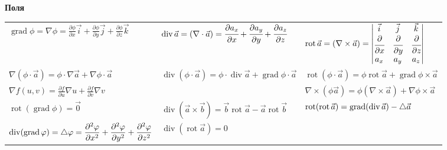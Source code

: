\begin{center}
    \textbf{Поля}
\end{center}
\begin{tabular}{l|l|l}
    $\displaystyle\operatorname{grad}{\phi} = \nabla\phi =  \frac{\partial{\phi}}{\partial{x}}\vec{i}+\frac{\partial{\phi}}{\partial{y}}\vec{j}+\frac{\partial{\phi}}{\partial{z}}\vec{k}$
    &
    $\displaystyle \operatorname{div}\vec{a} = (\nabla\cdot\vec{a}) = \cfrac{\partial a_x}{\partial x} + \cfrac{\partial a_y}{\partial y}+\cfrac{\partial a_z}{\partial z}$
    & 
    $\displaystyle\operatorname{rot}\vec{a} = (\nabla\times\vec{a})=
    \begin{vmatrix}
    \vec{i} & \vec{j} & \vec{k} \\
    \cfrac{\partial}{\partial x} & \cfrac{\partial}{\partial y} &
    \cfrac{\partial}{\partial z} \\
    a_x & a_y & a_z
    \end{vmatrix}$
    \\
    
    $\displaystyle\nabla{(\phi\cdot\vec{a})} = \phi\cdot\nabla\vec{a}+\nabla\phi\cdot\vec{a}$
    &
    $\displaystyle\operatorname{div}(\phi\cdot\vec{a}) = \phi\cdot\operatorname{div}\vec{a}+\operatorname{grad}{\phi}\cdot\vec{a}$
    & 
    $\displaystyle\operatorname{rot}(\phi\cdot\vec{a}) = \phi\operatorname{rot}\vec{a}+\operatorname{grad}\phi\times\vec{a}$
    \\
    
    $\displaystyle\nabla{f(u, v)} = \frac{\partial{f}}{\partial{u}}\nabla{u}+\frac{\partial{f}}{\partial{v}}\nabla{v}$
    &
    &
    $\displaystyle\nabla\times(\phi\vec{a}) = \phi(\nabla\times\vec{a})+\nabla\phi\times\vec{a}$
    \\
    
     $\displaystyle\operatorname{rot}(\operatorname{grad}\phi) = \vec{0}$
    &
    $\displaystyle\operatorname{div}(\vec{a}\times\vec{b}) = \vec{b}\operatorname{rot}\vec{a}-\vec{a}\operatorname{rot}\vec{b}$
    & 
    $\displaystyle\operatorname{rot}(\operatorname{rot}\vec{a}) = \operatorname{grad}(\operatorname{div}\vec{a}) - \mathop{}\!\mathbin\bigtriangleup\vec{a}$
    \\
    
    $\displaystyle\operatorname{div}(\operatorname{grad}\varphi) = \mathop{}\!\mathbin\bigtriangleup\varphi = \frac{\partial^2\varphi}{\partial{x^2}} + \frac{\partial^2\varphi}{\partial{y^2}} + \frac{\partial^2\varphi}{\partial{z^2}}$
    &
     $\displaystyle\operatorname{div}(\operatorname{rot}\vec{a}) = 0$
    &
    \\
\end{tabular} 

